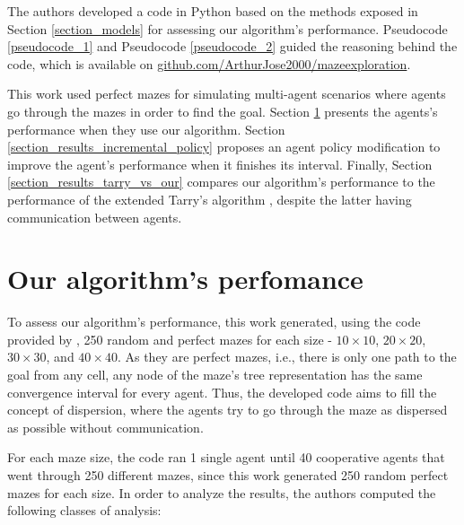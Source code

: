 \label{section_results}
The authors developed a code in Python based on the methods exposed in Section \ref{section_models} for assessing our algorithm's performance. Pseudocode \ref{pseudocode_1} and Pseudocode \ref{pseudocode_2} guided the reasoning behind the code, which is available on \href{https://github.com/ArthurJose2000/mazeexploration}{github.com/ArthurJose2000/mazeexploration}.

This work used perfect mazes for simulating multi-agent scenarios where agents go through the mazes in order to find the goal. Section \ref{section_results_our_performance} presents the agents's performance when they use our algorithm. Section \ref{section_results_incremental_policy} proposes an agent policy modification to improve the agent's performance when it finishes its interval. Finally, Section \ref{section_results_tarry_vs_our} compares our algorithm's performance to the performance of the extended Tarry's algorithm \cite{KivelevitchCohen2010}, despite the latter having communication between agents.

\section{Our algorithm's perfomance}
\label{section_results_our_performance}

To assess our algorithm's performance, this work generated, using the code provided by , 250 random and perfect mazes for each size - $10 \times 10$, $20 \times 20$, $30 \times 30$, and $40 \times 40$. As they are perfect mazes, i.e., there is only one path to the goal from any cell, any node of the maze's tree representation has the same convergence interval for every agent. Thus, the developed code aims to fill the concept of dispersion, where the agents try to go through the maze as dispersed as possible without communication.

For each maze size, the code ran 1 single agent until 40 cooperative agents that went through 250 different mazes, since this work generated 250 random perfect mazes for each size. In order to analyze the results, the authors computed the following classes of analysis:

